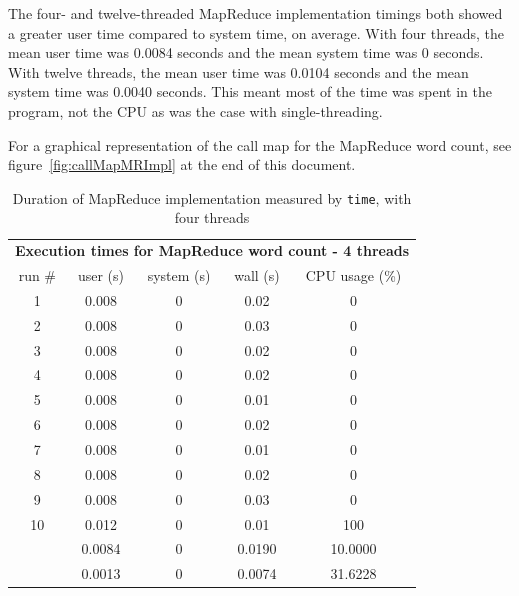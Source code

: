\documentclass[12pt, letterpaper]{article}
\begin{document}
	The four- and twelve-threaded MapReduce implementation timings both showed a greater user time compared to system time, on average. With four threads, the mean user time was 0.0084 seconds and the mean system time was 0 seconds. With twelve threads, the mean user time was 0.0104 seconds and the mean system time was 0.0040 seconds. This meant most of the time was spent in the program, not the CPU as was the case with single-threading.

	For a graphical representation of the call map for the MapReduce word count, see figure~\ref{fig:callMapMRImpl} at the end of this document.
	\begin{table}[h]
	\centering
	\begin{tabular}{ccccc}
	\multicolumn{5}{c}{\cellcolor[HTML]{FFFFC7}\textbf{Execution times for MapReduce word count - 4 threads}} \\
	\cellcolor[HTML]{EFEFEF}run \# & \cellcolor[HTML]{EFEFEF}user (s) & \cellcolor[HTML]{EFEFEF}system (s) & 				\cellcolor[HTML]{EFEFEF}wall (s) & \cellcolor[HTML]{EFEFEF}CPU usage (\%) \\
	1 & 0.008 & 0 & 0.02 & 0 \\
	2 & 0.008 & 0 & 0.03 & 0 \\
	3 & 0.008 & 0 & 0.02 & 0 \\
	4 & 0.008 & 0 & 0.02 & 0 \\
	5 & 0.008 & 0 & 0.01 & 0 \\
	6 & 0.008 & 0 & 0.02 & 0 \\
	7 & 0.008 & 0 & 0.01 & 0 \\
	8 & 0.008 & 0 & 0.02 & 0 \\
	9 & 0.008 & 0 & 0.03 & 0 \\
	10 & 0.012 & 0 & 0.01 & 100 \\
	\rowcolor[HTML]{D0F0D0} 
	\multicolumn{1}{r}{\cellcolor[HTML]{9AFF99}mean (s)} & 0.0084 & 0 & 0.0190 & 10.0000 \\
	\rowcolor[HTML]{ECF4FF} 
	\multicolumn{1}{r}{\cellcolor[HTML]{DAE8FC}std. dev. (s)} & 0.0013 & 0 & 0.0074 & 31.6228
	\end{tabular}
	\caption{Duration of MapReduce implementation measured by \texttt{time}, with four threads\label{table:MR4ImplWC}}
	\end{table}
\end{document}
